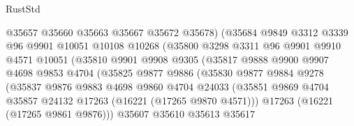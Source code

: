 \begin{lexlean}{RustStd}
\begin{coremodule}
                              @35657
                              @35660
                              @35663
                              @35667
                              @35672
                              @35678)
                            (@35684
                              @9849
                              @3312
                              @3339
                              @96
                              @9901
                              @10051
                              @10108
                              @10268
                              (@35800
                                @3298
                                @3311
                                @96
                                @9901
                                @9910
                                @4571
                                @10051
                                (@35810
                                  @9901
                                  @9908
                                  @9305
                                  (@35817
                                    @9888
                                    @9900
                                    @9907
                                    @4698
                                    @9853
                                    @4704
                                    (@35825
                                      @9877
                                      @9886
                                      (@35830
                                        @9877
                                        @9884
                                        @9278
                                        (@35837
                                          @9876
                                          @9883
                                          @4698
                                          @9860
                                          @4704
                                          @24033
                                          (@35851
                                            @9869
                                            @4704
                                            @35857
                                            @24132
                                            @17263
                                            (@16221 (@17265 @9870 @4571)))
                                          @17263
                                          (@16221 (@17265 @9861 @9876)))
                                        @35607
                                        @35610
                                        @35613
                                        @35617

\end{coremodule}
\end{lexlean}
